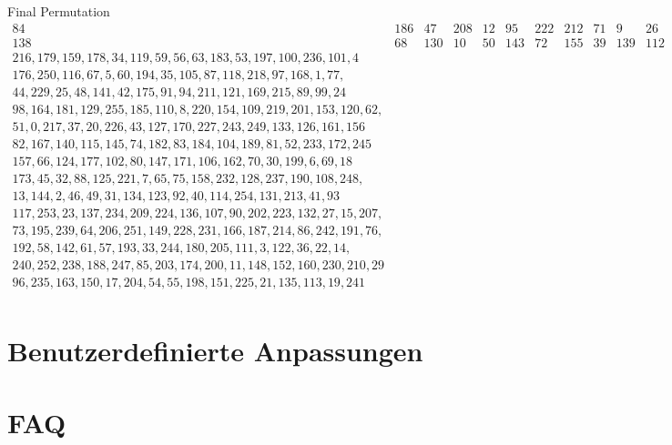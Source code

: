 \documentclass[
	aspectratio=169,	%
	onlytextwidth,		%
	t,					%
	]{beamer}
\begin{document}
\begin{frame}{Final Permutation}
	\small
	$\begin{array}{|cccccccccccccccc|}
		84& 186& 47& 208& 12& 95& 222& 212& 71& 9& 26& 246& 103& 38& 28& 165 \\
		138 & 68 & 130 & 10 & 50 & 143 & 72 & 155 & 39 & 139 & 112 & 16 & 79 & 78 & 196 & 146 \\
		216, 179, 159, 178, 34, 119, 59, 56, 63, 183, 53, 197, 100, 236, 101, 4 \\
		176, 250, 116, 67, 5, 60, 194, 35, 105, 87, 118, 218, 97, 168, 1, 77, \\
		44, 229, 25, 48, 141, 42, 175, 91, 94, 211, 121, 169, 215, 89, 99, 24 \\
		98, 164, 181, 129, 255, 185, 110, 8, 220, 154, 109, 219, 201, 153, 120, 62, \\
		51, 0, 217, 37, 20, 226, 43, 127, 170, 227, 243, 249, 133, 126, 161, 156 \\
		82, 167, 140, 115, 145, 74, 182, 83, 184, 104, 189, 81, 52, 233, 172, 245 \\
		157, 66, 124, 177, 102, 80, 147, 171, 106, 162, 70, 30, 199, 6, 69, 18 \\
		173, 45, 32, 88, 125, 221, 7, 65, 75, 158, 232, 128, 237, 190, 108, 248, \\
		13, 144, 2, 46, 49, 31, 134, 123, 92, 40, 114, 254, 131, 213, 41, 93 \\
		117, 253, 23, 137, 234, 209, 224, 136, 107, 90, 202, 223, 132, 27, 15, 207, \\
		73, 195, 239, 64, 206, 251, 149, 228, 231, 166, 187, 214, 86, 242, 191, 76, \\
		192, 58, 142, 61, 57, 193, 33, 244, 180, 205, 111, 3, 122, 36, 22, 14, \\
		240, 252, 238, 188, 247, 85, 203, 174, 200, 11, 148, 152, 160, 230, 210, 29 \\
		96, 235, 163, 150, 17, 204, 54, 55, 198, 151, 225, 21, 135, 113, 19, 241 \\
	\end{array}$
	\normalsize
\end{frame}

	\section{Benutzerdefinierte Anpassungen}

	\section{FAQ}

	\appendix
	\makethankyou

	\section{\appendixname}
\end{document}
